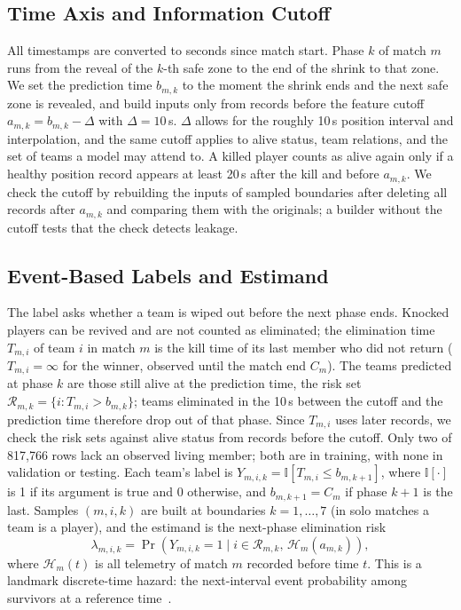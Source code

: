 \documentclass[sigconf,anonymous,nonacm]{acmart}
\begin{document}
\subsection{Time Axis and Information Cutoff}
All timestamps are converted to seconds since match start.
Phase $k$ of match $m$ runs from the reveal of the $k$-th safe zone to the end of the shrink to that zone.
We set the prediction time $b_{m,k}$ to the moment the shrink ends and the next safe zone is revealed, and build inputs only from records before the feature cutoff $a_{m,k}=b_{m,k}-\Delta$ with $\Delta=10$\,s.
$\Delta$ allows for the roughly 10\,s position interval and interpolation, and the same cutoff applies to alive status, team relations, and the set of teams a model may attend to.
A killed player counts as alive again only if a healthy position record appears at least 20\,s after the kill and before $a_{m,k}$.
We check the cutoff by rebuilding the inputs of sampled boundaries after deleting all records after $a_{m,k}$ and comparing them with the originals; a builder without the cutoff tests that the check detects leakage.

\subsection{Event-Based Labels and Estimand}
The label asks whether a team is wiped out before the next phase ends.
Knocked players can be revived and are not counted as eliminated; the elimination time $T_{m,i}$ of team $i$ in match $m$ is the kill time of its last member who did not return ($T_{m,i}=\infty$ for the winner, observed until the match end $C_m$).
The teams predicted at phase $k$ are those still alive at the prediction time, the risk set $\mathcal{R}_{m,k}=\{i: T_{m,i}>b_{m,k}\}$; teams eliminated in the 10\,s between the cutoff and the prediction time therefore drop out of that phase. Since $T_{m,i}$ uses later records, we check the risk sets against alive status from records before the cutoff. Only two of 817,766 rows lack an observed living member; both are in training, with none in validation or testing.
Each team's label is $Y_{m,i,k}=\mathbb{I}[T_{m,i}\le b_{m,k+1}]$, where $\mathbb{I}[\cdot]$ is 1 if its argument is true and 0 otherwise, and $b_{m,k+1}=C_m$ if phase $k+1$ is the last.
Samples $(m,i,k)$ are built at boundaries $k=1,\dots,7$ (in solo matches a team is a player), and the estimand is the next-phase elimination risk
\begin{equation}
\lambda_{m,i,k}=\Pr\!\left(Y_{m,i,k}=1 \mid i\in\mathcal{R}_{m,k},\,\mathcal{H}_{m}(a_{m,k})\right),
\label{eq:hazard}
\end{equation}
where $\mathcal{H}_{m}(t)$ is all telemetry of match $m$ recorded before time $t$.
This is a landmark discrete-time hazard: the next-interval event probability among survivors at a reference time~\cite{vanHouwelingen07}.
\end{document}

